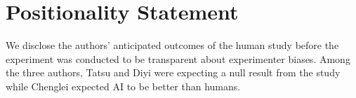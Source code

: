 \section*{Positionality Statement}

We disclose the authors' anticipated outcomes of the human study before the experiment was conducted to be transparent about experimenter biases. 
Among the three authors, Tatsu and Diyi were expecting a null result from the study while Chenglei expected AI to be better than humans. 
